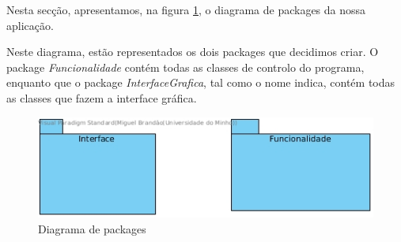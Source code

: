Nesta secção, apresentamos, na figura \ref{fig:diagrama_de_packages}, o diagrama de packages da nossa aplicação.

Neste diagrama, estão representados os dois packages que decidimos criar. O package \emph{Funcionalidade} contém todas as classes de controlo do programa, enquanto que o package \emph{InterfaceGrafica}, tal como o nome indica, contém todas as classes que fazem a interface gráfica. 

\begin{figure}
    \centering
    \includegraphics[width=\textwidth]{diagrama_de_classes/diagrama_de_packages.jpg}
    \caption{Diagrama de packages}
    \label{fig:diagrama_de_packages}
\end{figure}
